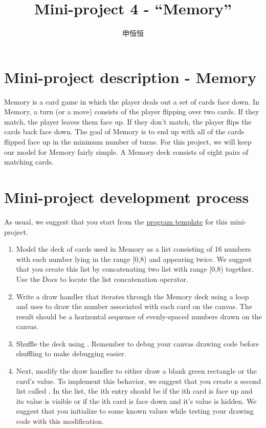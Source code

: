 \documentclass[a4paper,10pt]{article}
\title{Mini-project 4 - “Memory”}
\author{申恒恒}
\begin{document}
\begin{CJK}{UTF8}{gkai}
\maketitle

\section*{Mini-project description - Memory}

\noindent Memory is a card game in which the player deals out a set of cards face down. In Memory, a turn (or a move) consists of the player flipping over two cards. If they match, the player leaves them face up. If they don't match, the player flips the cards back face down. The goal of Memory is to end up with all of the cards flipped face up in the minimum number of turns. For this project, we will keep our model for Memory fairly simple. A Memory deck consists of eight pairs of matching cards.

\section*{Mini-project development process}

\noindent As usual, we suggest that you start from the \href{http://www.codeskulptor.org/#examples-memory_template.py}{program template} for this mini-project.
\begin{enumerate}


\item Model the deck of cards used in Memory as a list consisting of 16 numbers with each number lying in the range [0,8) and appearing twice. We suggest that you create this list by concatenating two list with range [0,8) together. Use the Docs to locate the list concatenation operator.

\item Write a draw handler that iterates through the Memory deck using a {\color{red}{for}} loop and uses {\color{red}{draw\_text}} to draw the number associated with each card on the canvas. The result should be a horizontal sequence of evenly-spaced numbers drawn on the canvas.

\item Shuffle the deck using {\color{red}{random.shuffle()}}. Remember to debug your canvas drawing code before shuffling to make debugging easier.

\item Next, modify the draw handler to either draw a blank green rectangle or the card's value. To implement this behavior, we suggest that you create a second list called {\color{red}{exposed}}. In the {\color{red}{exposed}} list, the ith entry should be {\color{red}{True}} if the ith card is face up and its value is visible or {\color{red}{False}} if the ith card is face down and it's value is hidden. We suggest that you initialize {\color{red}{exposed}} to some known values while testing your drawing code with this modification.


\end{enumerate}
\end{CJK}
\end{document}
